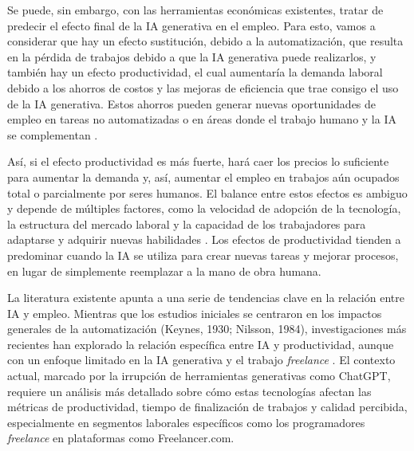 \documentclass[twocolumn]{article}
\begin{document}
Se puede, sin embargo, con las herramientas económicas existentes, tratar de predecir el efecto final de la IA generativa en el empleo. Para esto, vamos a considerar que hay un efecto sustitución, debido a la automatización, que resulta en la pérdida de trabajos debido a que la IA generativa puede realizarlos, y también hay un efecto productividad, el cual aumentaría la demanda laboral debido a los ahorros de costos y las mejoras de eficiencia que trae consigo el uso de la IA generativa. Estos ahorros pueden generar nuevas oportunidades de empleo en tareas no automatizadas o en áreas donde el trabajo humano y la IA se complementan \parencite{oecd2023}.

Así, si el efecto productividad es más fuerte, hará caer los precios lo suficiente para aumentar la demanda y, así, aumentar el empleo en trabajos aún ocupados total o parcialmente por seres humanos. El balance entre estos efectos es ambiguo y depende de múltiples factores, como la velocidad de adopción de la tecnología, la estructura del mercado laboral y la capacidad de los trabajadores para adaptarse y adquirir nuevas habilidades \parencite{oecd2023}. Los efectos de productividad tienden a predominar cuando la IA se utiliza para crear nuevas tareas y mejorar procesos, en lugar de simplemente reemplazar a la mano de obra humana.

La literatura existente apunta a una serie de tendencias clave en la relación entre IA y empleo. Mientras que los estudios iniciales se centraron en los impactos generales de la automatización (Keynes, 1930; Nilsson, 1984), investigaciones más recientes han explorado la relación específica entre IA y productividad, aunque con un enfoque limitado en la IA generativa y el trabajo \emph{freelance} \parencite{brynjolfsson2014, katz2019}. El contexto actual, marcado por la irrupción de herramientas generativas como ChatGPT, requiere un análisis más detallado sobre cómo estas tecnologías afectan las métricas de productividad, tiempo de finalización de trabajos y calidad percibida, especialmente en segmentos laborales específicos como los programadores \emph{freelance} en plataformas como Freelancer.com.

\printbibliography
\end{document}
